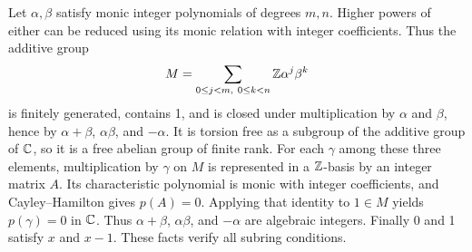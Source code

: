 Let $\alpha,\beta$ satisfy monic integer polynomials of degrees $m,n$. Higher powers of either can be reduced using its monic relation with integer coefficients. Thus the additive group
\[M=\sum_{0\le j<m,\ 0\le k<n}\mathbb{Z}\alpha^j\beta^k\]
is finitely generated, contains 1, and is closed under multiplication by $\alpha$ and $\beta$, hence by $\alpha+\beta$, $\alpha\beta$, and $-\alpha$. It is torsion free as a subgroup of the additive group of $\mathbb{C}$, so it is a free abelian group of finite rank. For each $\gamma$ among these three elements, multiplication by $\gamma$ on $M$ is represented in a $\mathbb{Z}$-basis by an integer matrix $A$. Its characteristic polynomial is monic with integer coefficients, and Cayley--Hamilton gives $p(A)=0$. Applying that identity to $1\in M$ yields $p(\gamma)=0$ in $\mathbb{C}$. Thus $\alpha+\beta$, $\alpha\beta$, and $-\alpha$ are algebraic integers. Finally 0 and 1 satisfy $x$ and $x-1$. These facts verify all subring conditions.
